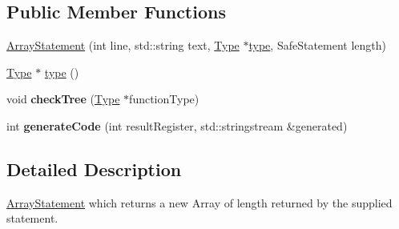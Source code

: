 \subsection*{Public Member Functions}
\begin{DoxyCompactItemize}
\item 
\hyperlink{class_array_statement_a2791a7907b8235a73fb4cd9c9050354e}{Array\-Statement} (int line, std\-::string text, \hyperlink{class_type}{Type} $\ast$\hyperlink{class_array_statement_ad65ac4f880502564214683ad6e241ea7}{type}, Safe\-Statement length)
\item 
\hyperlink{class_type}{Type} $\ast$ \hyperlink{class_array_statement_ad65ac4f880502564214683ad6e241ea7}{type} ()
\item 
\hypertarget{class_array_statement_a09510f4b59845794d744637aab1e64ee}{void {\bfseries check\-Tree} (\hyperlink{class_type}{Type} $\ast$function\-Type)}\label{class_array_statement_a09510f4b59845794d744637aab1e64ee}

\item 
\hypertarget{class_array_statement_acbc79ada700420f2899dd89d1011fe61}{int {\bfseries generate\-Code} (int result\-Register, std\-::stringstream \&generated)}\label{class_array_statement_acbc79ada700420f2899dd89d1011fe61}

\end{DoxyCompactItemize}


\subsection{Detailed Description}
\hyperlink{class_array_statement}{Array\-Statement} which returns a new Array of length returned by the supplied statement. 

